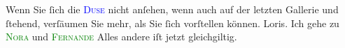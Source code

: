            \pstart
           Wenn Sie ſich die \textcolor{blue}{\textsc{Duse}}{}\ledrightnote{\textcolor{blue}{Eleonora Duse}} nicht anſehen, wenn auch auf der letzten Gallerie und ſtehend, verſäumen Sie
               mehr, als Sie ſich vorſtellen können.\pend
           \pstart \spacefill\mbox{Loris.}\pend{}\pstart
           \noindent{}Ich gehe zu \textcolor{green}{\textsc{Nora}}{}\ledrightnote{\textcolor{green}{Nora oder ein Puppenheim}} und \textcolor{green}{\textsc{Fernande}}{}\ledrightnote{\textcolor{green}{Fernande}}\pend
           \pstart
           Alles andere iſt jetzt gleichgiltig.\pend
           \endnumbering{}  
      